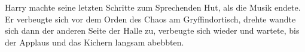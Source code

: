 Harry machte seine letzten Schritte zum Sprechenden Hut, als die Musik endete. Er verbeugte sich vor dem Orden des Chaos am Gryffindortisch, drehte wandte sich dann der anderen Seite der Halle zu, verbeugte sich wieder und wartete, bis der Applaus und das Kichern langsam abebbten.








